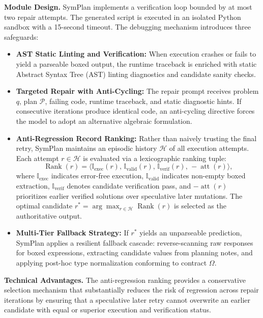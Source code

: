 \documentclass[runningheads]{llncs}
\begin{document}
\textbf{Module Design.} SymPlan implements a verification loop bounded by at most two repair attempts. The generated script is executed in an isolated Python sandbox with a 15-second timeout. The debugging mechanism introduces three safeguards:
\begin{itemize}
    \item \textbf{AST Static Linting and Verification:} When execution crashes or fails to yield a parseable boxed output, the runtime traceback is enriched with static Abstract Syntax Tree (AST) linting diagnostics and candidate sanity checks.
    \item \textbf{Targeted Repair with Anti-Cycling:} The repair prompt receives problem $q$, plan $\mathcal{P}$, failing code, runtime traceback, and static diagnostic hints. If consecutive iterations produce identical code, an anti-cycling directive forces the model to adopt an alternative algebraic formulation.
    \item \textbf{Anti-Regression Record Ranking:} Rather than naively trusting the final retry, SymPlan maintains an episodic history $\mathcal{H}$ of all execution attempts. Each attempt $r \in \mathcal{H}$ is evaluated via a lexicographic ranking tuple:
    \begin{equation}
    \operatorname{Rank}(r) = \bigl\langle \mathbb{I}_{\text{exec}}(r),\, \mathbb{I}_{\text{valid}}(r),\, \mathbb{I}_{\text{verif}}(r),\, -\operatorname{att}(r) \bigr\rangle,
    \label{eq:rank}
    \end{equation}
    where $\mathbb{I}_{\text{exec}}$ indicates error-free execution, $\mathbb{I}_{\text{valid}}$ indicates non-empty boxed extraction, $\mathbb{I}_{\text{verif}}$ denotes candidate verification pass, and $-\operatorname{att}(r)$ prioritizes earlier verified solutions over speculative later mutations. The optimal candidate $r^* = \arg\max_{r \in \mathcal{H}} \operatorname{Rank}(r)$ is selected as the authoritative output.
    \item \textbf{Multi-Tier Fallback Strategy:} If $r^*$ yields an unparseable prediction, SymPlan applies a resilient fallback cascade: reverse-scanning raw responses for boxed expressions, extracting candidate values from planning notes, and applying post-hoc type normalization conforming to contract $\Omega$.
\end{itemize}

\textbf{Technical Advantages.} The anti-regression ranking provides a conservative selection mechanism that substantially reduces the risk of regression across repair iterations by ensuring that a speculative later retry cannot overwrite an earlier candidate with equal or superior execution and verification status.
\end{document}
